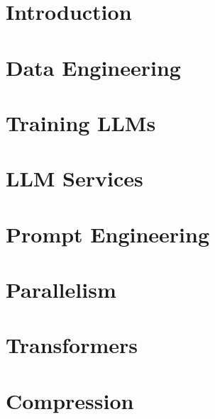 \documentclass[oneside, a4paper,11pt]{book}
\begin{document}
\mainmatter
\part{Introduction}


\part{Data Engineering}

\part{Training LLMs}


\part{LLM Services}

\part{Prompt Engineering}

\part{Parallelism}

\part{Transformers}

\part{Compression}


\backmatter

\nocite{*}


\end{document}
